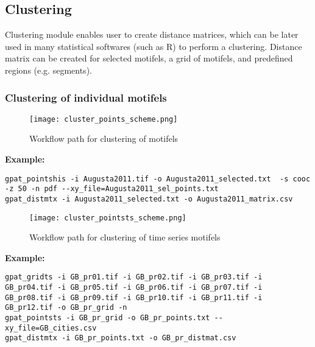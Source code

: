 \FloatBarrier

\subsection{Clustering}

Clustering module enables user to create distance matrices, which can be later used in many statistical softwares (such as R) to perform a clustering.
Distance matrix can be created for selected motifels,
a grid of motifels, and predefined regions (e.g. segments).

\subsubsection{Clustering of individual motifels}

\begin{figure}[H]
	\centering
	\texttt{[image: cluster\_points\_scheme.png]}
	\caption{Workflow path for clustering of motifels}
	\label{FIG:CLUSTER_POINTS}
\end{figure}

{\bf Example:}

\begin{minipage}{\linewidth}
\begin{lstlisting}
gpat_pointshis -i Augusta2011.tif -o Augusta2011_selected.txt  -s cooc -z 50 -n pdf --xy_file=Augusta2011_sel_points.txt
gpat_distmtx -i Augusta2011_selected.txt -o Augusta2011_matrix.csv
\end{lstlisting}
\end{minipage}

\begin{figure}[H]
	\centering
	\texttt{[image: cluster\_pointsts\_scheme.png]}
	\caption{Workflow path for clustering of time series motifels}
	\label{FIG:CLUSTER_POINTSTS}
\end{figure}

{\bf Example:}

\begin{minipage}{\linewidth}
\begin{lstlisting}
gpat_gridts -i GB_pr01.tif -i GB_pr02.tif -i GB_pr03.tif -i GB_pr04.tif -i GB_pr05.tif -i GB_pr06.tif -i GB_pr07.tif -i GB_pr08.tif -i GB_pr09.tif -i GB_pr10.tif -i GB_pr11.tif -i GB_pr12.tif -o GB_pr_grid -n
gpat_pointsts -i GB_pr_grid -o GB_pr_points.txt --xy_file=GB_cities.csv
gpat_distmtx -i GB_pr_points.txt -o GB_pr_distmat.csv
\end{lstlisting}
\end{minipage}

